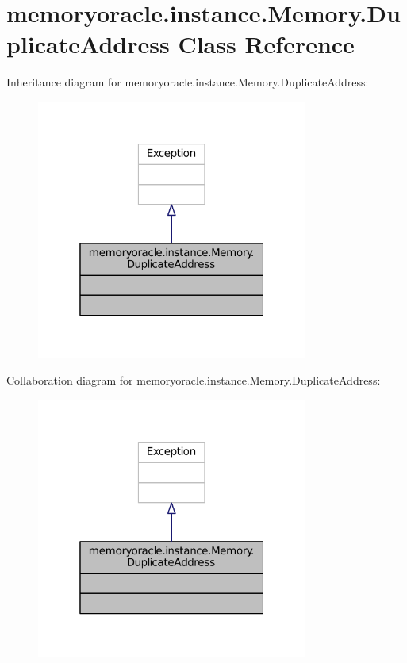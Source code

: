 \hypertarget{classmemoryoracle_1_1instance_1_1Memory_1_1DuplicateAddress}{}\section{memoryoracle.\+instance.\+Memory.\+Duplicate\+Address Class Reference}
\label{classmemoryoracle_1_1instance_1_1Memory_1_1DuplicateAddress}


Inheritance diagram for memoryoracle.\+instance.\+Memory.\+Duplicate\+Address\+:
\nopagebreak
\begin{figure}[H]
\begin{center}
\leavevmode
\includegraphics[width=253pt]{classmemoryoracle_1_1instance_1_1Memory_1_1DuplicateAddress__inherit__graph}
\end{center}
\end{figure}


Collaboration diagram for memoryoracle.\+instance.\+Memory.\+Duplicate\+Address\+:
\nopagebreak
\begin{figure}[H]
\begin{center}
\leavevmode
\includegraphics[width=253pt]{classmemoryoracle_1_1instance_1_1Memory_1_1DuplicateAddress__coll__graph}
\end{center}
\end{figure}


